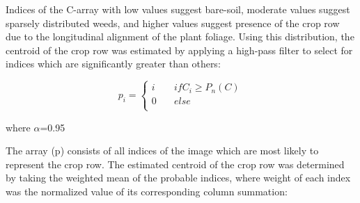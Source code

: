 Indices of the C-array with low values suggest bare-soil, moderate
values suggest sparsely distributed weeds, and higher values suggest
presence of the crop row due to the longitudinal alignment of the
plant foliage. Using this distribution, the centroid of the crop row
was estimated by applying a high-pass filter to select for indices
which are significantly greater than others: 

\begin{equation}
  p_{i} =
  \begin{cases}
    i & \quad if C_{i} \geq P_{n}(C) \\
    0 & \quad else \\
  \end{cases}
  \label{eq:p_threshold}
\end{equation}
\begin{flushleft}
where $\alpha$=0.95
\end{flushleft}

The array (p) consists of all indices of the image which are most
likely to represent the crop row. The estimated centroid of the crop
row was determined by taking the weighted mean of the probable
indices, where weight of each index was the normalized value of its
corresponding column summation:


